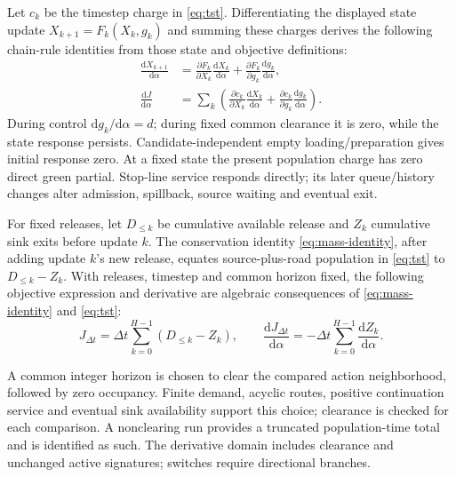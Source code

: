 \documentclass[10pt,a4paper]{article}
\begin{document}
Let $c_k$ be the timestep charge in \eqref{eq:tst}. Differentiating
the displayed state update $X_{k+1}=F_k(X_k,g_k)$ and summing these charges
derives the following chain-rule identities from those state and objective definitions:
\begin{equation}
 \begin{aligned}
 \frac{\mathrm dX_{k+1}}{\mathrm d\alpha}
 &=\frac{\partial F_k}{\partial X_k}
            \frac{\mathrm dX_k}{\mathrm d\alpha}
  +\frac{\partial F_k}{\partial g_k}
            \frac{\mathrm dg_k}{\mathrm d\alpha},\\
 \frac{\mathrm dJ}{\mathrm d\alpha}
 &=\sum_k\left(
 \frac{\partial c_k}{\partial X_k}\frac{\mathrm dX_k}{\mathrm d\alpha}
 +\frac{\partial c_k}{\partial g_k}\frac{\mathrm dg_k}{\mathrm d\alpha}
 \right).
 \end{aligned}
 \label{eq:state-sensitivity}
\end{equation}
During control $\mathrm dg_k/\mathrm d\alpha=d$; during fixed common
clearance it is zero, while the state response persists. Candidate-independent
empty loading/preparation gives initial response zero. At a fixed state
the present population charge has zero direct green partial. Stop-line
service responds directly; its later queue/history changes alter admission,
spillback, source waiting and eventual exit.

\par\begin{samepage}
For fixed releases, let $D_{\leq k}$ be cumulative available release and
$Z_k$ cumulative sink exits before update $k$. The conservation identity \eqref{eq:mass-identity}, after adding
update $k$'s new release, equates source-plus-road population in
\eqref{eq:tst} to $D_{\leq k}-Z_k$. With releases, timestep and common
horizon fixed,
the following objective expression and derivative are algebraic consequences of \eqref{eq:mass-identity} and \eqref{eq:tst}:
\begin{equation}
 J_{\Delta t}=\Delta t\sum_{k=0}^{H-1}(D_{\leq k}-Z_k),\qquad
 \frac{\mathrm dJ_{\Delta t}}{\mathrm d\alpha}
 =-\Delta t\sum_{k=0}^{H-1}\frac{\mathrm dZ_k}{\mathrm d\alpha}.
 \label{eq:exit-objective}
\end{equation}
\par\end{samepage}

\par

A common integer horizon is chosen to clear the compared action
neighborhood, followed by zero occupancy. Finite demand, acyclic routes,
positive continuation service and eventual sink availability support
this choice; clearance is checked for each comparison. A nonclearing
run provides a truncated population-time total and is identified as such.
The derivative domain includes clearance and unchanged active signatures;
switches require directional branches.
\end{document}
